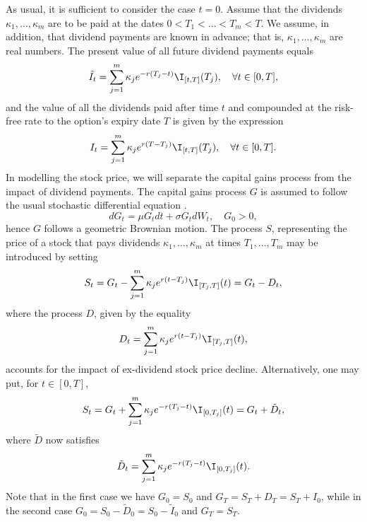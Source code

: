 As usual, it is sufficient to consider the case $t = 0$. Assume that the dividends $\kappa_1, \dots, \kappa_m$ are to be paid at the dates $0 < T_1 < \dots < T_m < T$. We assume, in addition, that dividend payments are known in advance; that is, $\kappa_1, \dots, \kappa_m$ are real numbers. The present value of all future dividend payments equals
\begin{equation}
	\tilde{I}_t = \sum_{j=1}^{m} \kappa_j e^{-r(T_j - t)} \I_{[t, T]}(T_j), \quad \forall t \in [0, T],
	\label{eq:PresentValueDividends}
\end{equation}
and the value of all the dividends paid after time $t$ and compounded at the risk-free rate to the option's expiry date $T$ is given by the expression
\begin{equation}
	I_t = \sum_{j=1}^{m} \kappa_j e^{r(T - T_j)} \I_{[t, T]}(T_j), \quad \forall t \in [0, T].
	\label{eq:CompoundedValueDividends}
\end{equation}
In modelling the stock price, we will separate the capital gains process from the impact of dividend payments. The capital gains process $G$ is assumed to follow the usual stochastic differential equation \citep{heath_ex-dividend_1988}.
\begin{equation}
	dG_t = \mu G_t dt + \sigma G_t dW_t, \quad G_0 > 0,
	\label{eq:GeometricBrownianMotionG}
\end{equation}
hence $G$ follows a geometric Brownian motion. The process $S$, representing the price of a stock that pays dividends $\kappa_1, \dots, \kappa_m$ at times $T_1, \dots, T_m$ may be introduced by setting
\begin{equation}
	S_t = G_t - \sum_{j=1}^{m} \kappa_j e^{r(t-T_j)} \I_{[T_j, T]}(t) = G_t - D_t,
	\label{eq:StockPriceDividendsOne}
\end{equation}
where the process $D$, given by the equality
\begin{equation}
	D_t = \sum_{j=1}^{m} \kappa_j e^{r(t-T_j)} \I_{[T_j, T]}(t),
	\label{eq:DividendProcessOne}
\end{equation}
accounts for the impact of ex-dividend stock price decline. Alternatively, one may put, for $t \in [0, T]$,
\begin{equation}
	S_t = G_t + \sum_{j=1}^{m} \kappa_j e^{-r(T_j - t)} \I_{[0, T_j]}(t) = G_t + \tilde{D}_t,
	\label{eq:StockPriceDividendsTwo}
\end{equation}
where $\tilde{D}$ now satisfies
\begin{equation}
	\tilde{D}_t = \sum_{j=1}^{m} \kappa_j e^{-r(T_j - t)} \I_{[0, T_j]}(t).
	\label{eq:DividendProcessTwo}
\end{equation}
Note that in the first case we have $G_0 = S_0$ and $G_T = S_T + D_T = S_T + I_0$, while in the second case $G_0 = S_0 - \tilde{D}_0 = S_0 - \tilde{I}_0$ and $G_T = S_T$.

